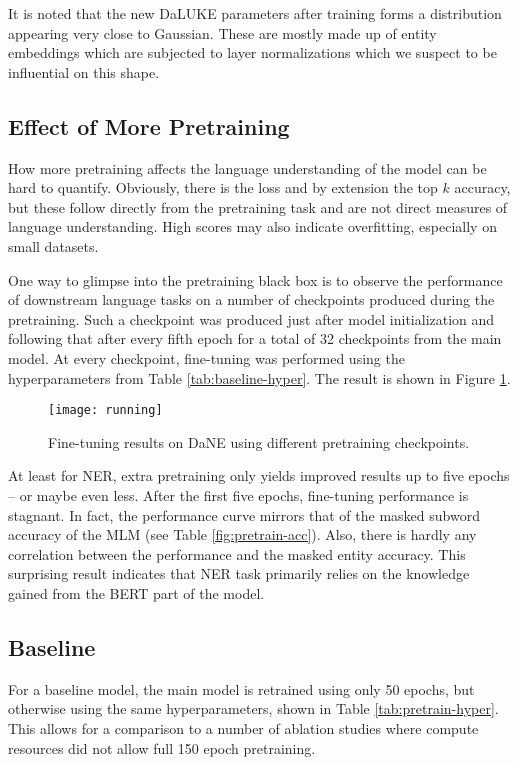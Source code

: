 \documentclass[main.tex]{subfiles}
\begin{document}
It is noted that the new DaLUKE parameters after training forms a distribution appearing very close to Gaussian.
These are mostly made up of entity embeddings which are subjected to layer normalizations which we suspect to be influential on this shape.

\subsection{Effect of More Pretraining}
\label{subsec:effmore}
How more pretraining affects the language understanding of the model can be hard to quantify.
Obviously, there is the loss and by extension the top $ k $ accuracy, but these follow directly from the pretraining task and are not direct measures of language understanding.
High scores may also indicate overfitting, especially on small datasets.

One way to glimpse into the pretraining black box is to observe the performance of downstream language tasks on a number of checkpoints produced during the pretraining.
Such a checkpoint was produced just after model initialization and following that after every fifth epoch for a total of 32 checkpoints from the main model.
At every checkpoint, fine-tuning was performed using the hyperparameters from Table \ref{tab:baseline-hyper}.
The result is shown in Figure \ref{fig:running}.
\begin{figure}[H]
    \centering
    \texttt{[image: running]}
    \caption{Fine-tuning results on DaNE using different pretraining checkpoints.}
    \label{fig:running}
\end{figure}\noindent
At least for NER, extra pretraining only yields improved results up to five epochs -- or maybe even less.
After the first five epochs, fine-tuning performance is stagnant.
In fact, the performance curve mirrors that of the masked subword accuracy of the MLM (see Table \ref{fig:pretrain-acc}).
Also, there is hardly any correlation between the performance and the masked entity accuracy.
This surprising result indicates that NER task primarily relies on the knowledge gained from the BERT part of the model.

\subsection{Baseline}
For a baseline model, the main model is retrained using only 50 epochs, but otherwise using the same hyperparameters, shown in Table \ref{tab:pretrain-hyper}.
This allows for a comparison to a number of ablation studies where compute resources did not allow full 150 epoch pretraining.
\end{document}
